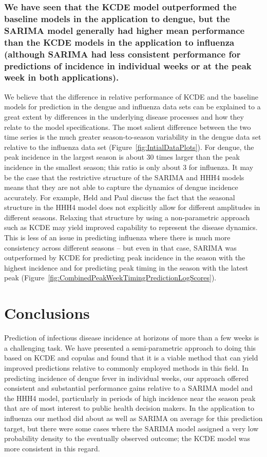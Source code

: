 \documentclass[times, doublespace]{simauth}\usepackage[]{graphicx}\usepackage[]{color}
\begin{document}
\subsubsection{We have seen that the KCDE model outperformed the baseline models in the application to dengue, but the SARIMA model generally had higher mean performance than the KCDE models in the application to influenza (although SARIMA had less consistent performance for predictions of incidence in individual weeks or at the peak week in both applications).}
We believe that the difference in relative performance of KCDE and the baseline
models for prediction in the dengue and influenza data sets can be explained to
a great extent by differences in the underlying disease processes and how they relate to
the model specifications.  The most salient difference between the two
time series is the much greater season-to-season variability in the dengue
data set relative to the influenza data set (Figure~\ref{fig:IntialDataPlots}).
For dengue, the peak incidence in the largest season is about 30
times larger than the peak incidence in the smallest season; this ratio is only
about 3 for influenza.  It may be the case that the restrictive
structure of the SARIMA and HHH4 models means that they are not able to capture
the dynamics of dengue incidence accurately.  For example, Held and Paul
\cite{Held2012HHHSeasonality} discuss the fact that the seasonal structure in
the HHH4 model does not explicitly allow for different amplitudes in different seasons.
Relaxing that structure by using a non-parametric approach such as KCDE may yield
improved capability to represent the disease dynamics.  This is less of an issue in predicting influenza where
there is much more consistency across different seasons -- but even in that case, SARIMA was outperformed by KCDE for predicting peak incidence in the season with the highest incidence and for predicting peak timing in the season with the latest peak (Figure~\ref{fig:CombinedPeakWeekTimingPredictionLogScores}).


\section{Conclusions}

Prediction of infectious disease incidence at horizons of more than a few weeks
is a challenging task.  We have presented a semi-parametric approach to doing
this based on KCDE and copulas and found that it is a viable method that
can yield improved predictions relative to commonly employed methods in this
field.  In predicting incidence of dengue fever in individual weeks,
our approach offered consistent and substantial performance gains relative to a
SARIMA model and the HHH4 model, particularly in periods of high incidence near
the season peak that are of most interest to public health decision
makers.   In the application to influenza
our method did about as well as SARIMA on average for this prediction target,
but there were some cases where the SARIMA model assigned a very low probability
density to the eventually observed outcome; the KCDE model was more consistent in this regard.
\end{document}
